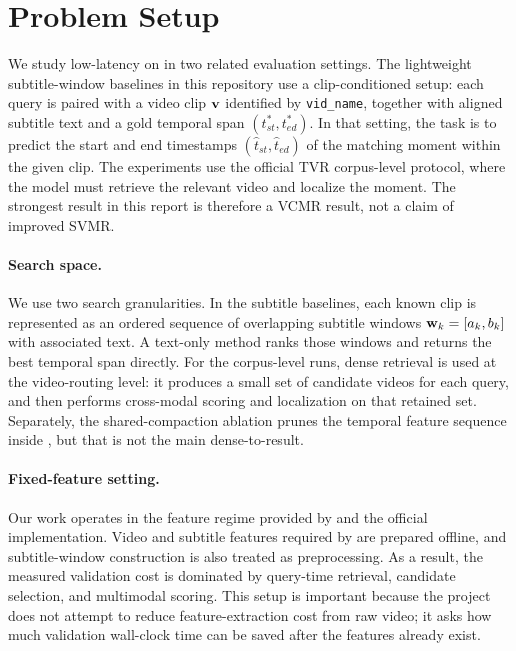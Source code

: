 \section{Problem Setup}
\label{sec:problem-setup}

We study low-latency \task on \dataset \cite{lei2020tvr} in two related evaluation settings. The lightweight subtitle-window baselines in this repository use a clip-conditioned setup: each query is paired with a video clip $\mathbf{v}$ identified by \texttt{vid\_name}, together with aligned subtitle text and a gold temporal span $(t^{*}_{st}, t^{*}_{ed})$. In that setting, the task is to predict the start and end timestamps $(\hat{t}_{st}, \hat{t}_{ed})$ of the matching moment within the given clip. The \xml experiments use the official TVR corpus-level protocol, where the model must retrieve the relevant video and localize the moment. The strongest result in this report is therefore a VCMR result, not a claim of improved SVMR.

\paragraph{Search space.}
We use two search granularities. In the subtitle baselines, each known clip is represented as an ordered sequence of overlapping subtitle windows $\mathbf{w}_k = [a_k, b_k]$ with associated text. A text-only method ranks those windows and returns the best temporal span directly. For the corpus-level \xml runs, dense retrieval is used at the video-routing level: it produces a small set of candidate videos for each query, and \xml then performs cross-modal scoring and localization on that retained set. Separately, the shared-compaction ablation prunes the temporal feature sequence inside \xml, but that is not the main dense-to-\xml result.

\paragraph{Fixed-feature setting.}
Our work operates in the feature regime provided by \dataset and the official \xml implementation. Video and subtitle features required by \xml are prepared offline, and subtitle-window construction is also treated as preprocessing. As a result, the measured validation cost is dominated by query-time retrieval, candidate selection, and multimodal scoring. This setup is important because the project does not attempt to reduce feature-extraction cost from raw video; it asks how much validation wall-clock time can be saved after the features already exist.

